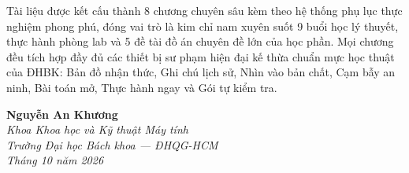 \documentclass{hcmut-textbook}
\begin{document}
Tài liệu được kết cấu thành 8 chương chuyên sâu kèm theo hệ thống phụ lục thực nghiệm phong phú, đóng vai trò là kim chỉ nam xuyên suốt 9 buổi học lý thuyết, thực hành phòng lab và 5 đề tài đồ án chuyên đề lớn của học phần. Mọi chương đều tích hợp đầy đủ các thiết bị sư phạm hiện đại kế thừa chuẩn mực học thuật của ĐHBK: Bản đồ nhận thức, Ghi chú lịch sử, Nhìn vào bản chất, Cạm bẫy an ninh, Bài toán mở, Thực hành ngay và Gói tự kiểm tra.

\vspace{1.5cm}
\begin{flushright}
  \textbf{Nguyễn An Khương}\\
  \textit{Khoa Khoa học và Kỹ thuật Máy tính}\\
  \textit{Trường Đại học Bách khoa --- ĐHQG-HCM}\\
  \textit{Tháng 10 năm 2026}
\end{flushright}
\clearpage

\tableofcontents
\clearpage

\mainmatter










\backmatter


\end{document}
